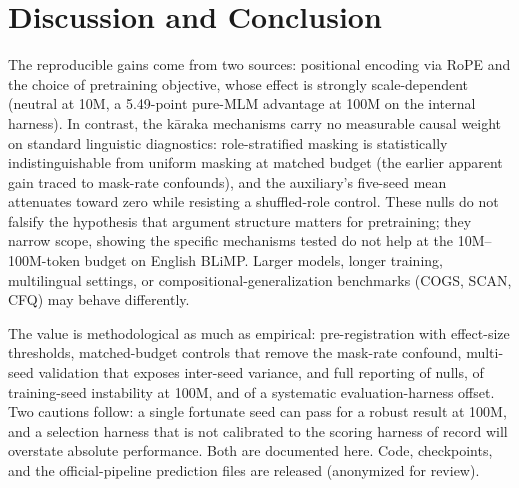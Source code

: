 \documentclass[11pt]{article}
\begin{document}
\section{Discussion and Conclusion}
\label{sec:discussion}
The reproducible gains come from two sources: positional encoding via RoPE and the choice of pretraining objective, whose effect is strongly scale-dependent (neutral at 10M, a 5.49-point pure-MLM advantage at 100M on the internal harness). In contrast, the k\=araka mechanisms carry no measurable causal weight on standard linguistic diagnostics: role-stratified masking is statistically indistinguishable from uniform masking at matched budget (the earlier apparent gain traced to mask-rate confounds), and the auxiliary's five-seed mean attenuates toward zero while resisting a shuffled-role control. These nulls do not falsify the hypothesis that argument structure matters for pretraining; they narrow scope, showing the specific mechanisms tested do not help at the 10M--100M-token budget on English BLiMP. Larger models, longer training, multilingual settings, or compositional-generalization benchmarks (COGS, SCAN, CFQ) \cite{Kim2020COGS,Lake2018SCAN,Keysers2020CFQ} may behave differently.

The value is methodological as much as empirical: pre-registration with effect-size thresholds, matched-budget controls that remove the mask-rate confound, multi-seed validation that exposes inter-seed variance, and full reporting of nulls, of training-seed instability at 100M, and of a systematic evaluation-harness offset. Two cautions follow: a single fortunate seed can pass for a robust result at 100M, and a selection harness that is not calibrated to the scoring harness of record will overstate absolute performance. Both are documented here. Code, checkpoints, and the official-pipeline prediction files are released (anonymized for review).
\end{document}
